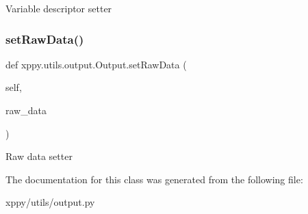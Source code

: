 \begin{DoxyVerb}Variable descriptor setter
\end{DoxyVerb}
 \mbox{\label{classxppy_1_1utils_1_1output_1_1_output_a7e7668fe3d38328b0e5f5011330dbe50}} 
\subsubsection{\texorpdfstring{set\+Raw\+Data()}{setRawData()}}
{\footnotesize\ttfamily def xppy.\+utils.\+output.\+Output.\+set\+Raw\+Data (\begin{DoxyParamCaption}\item[{}]{self,  }\item[{}]{raw\+\_\+data }\end{DoxyParamCaption})}

\begin{DoxyVerb}Raw data setter
\end{DoxyVerb}
 

The documentation for this class was generated from the following file\+:\begin{DoxyCompactItemize}
\item 
xppy/utils/output.\+py\end{DoxyCompactItemize}
